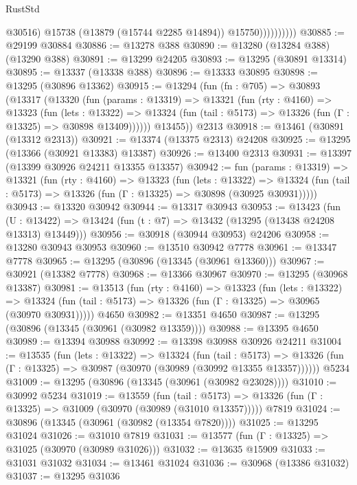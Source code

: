\begin{lexlean}{RustStd}
\begin{coremodule}
                          @30516)
                        @15738
                        (@13879 (@15744 @2285 @14894))
                        @15750))))))))))
@30885 := @29199 @30884
@30886 := @13278 @388
@30890 := @13280 (@13284 @388) (@13290 @388)
@30891 := @13299 @24205
@30893 := @13295 (@30891 @13314)
@30895 := @13337 (@13338 @388)
@30896 := @13333 @30895
@30898 := @13295 (@30896 @13362)
@30915 := @13294
    (fun (fn : @705) =>
    @30893
      (@13317
        (@13320
          (fun (params : @13319) =>
          @13321
            (fun (rty : @4160) =>
            @13323
              (fun (lets : @13322) =>
              @13324 (fun (tail : @5173) => @13326 (fun (Γ : @13325) => @30898 @13409))))))
        @13455))
    @2313
@30918 := @13461 (@30891 (@13312 @2313))
@30921 := @13374 (@13375 @2313) @24208
@30925 := @13295 (@13366 (@30921 @13383) @13387)
@30926 := @13400 @2313
@30931 := @13397 (@13399 @30926 @24211 @13355 @13357)
@30942 := fun (params : @13319) =>
  @13321
    (fun (rty : @4160) =>
    @13323
      (fun (lets : @13322) =>
      @13324 (fun (tail : @5173) => @13326 (fun (Γ : @13325) => @30898 (@30925 @30931)))))
@30943 := @13320 @30942
@30944 := @13317 @30943
@30953 := @13423
    (fun (U : @13422) => @13424 (fun (t : @7) => @13432 (@13295 (@13438 @24208 @13313) @13449)))
@30956 := @30918 (@30944 @30953) @24206
@30958 := @13280 @30943 @30953
@30960 := @13510 @30942 @7778
@30961 := @13347 @7778
@30965 := @13295 (@30896 (@13345 (@30961 @13360)))
@30967 := @30921 (@13382 @7778)
@30968 := @13366 @30967
@30970 := @13295 (@30968 @13387)
@30981 := @13513
    (fun (rty : @4160) =>
    @13323
      (fun (lets : @13322) =>
      @13324 (fun (tail : @5173) => @13326 (fun (Γ : @13325) => @30965 (@30970 @30931)))))
    @4650
@30982 := @13351 @4650
@30987 := @13295 (@30896 (@13345 (@30961 (@30982 @13359))))
@30988 := @13395 @4650
@30989 := @13394 @30988
@30992 := @13398 @30988 @30926 @24211
@31004 := @13535
    (fun (lets : @13322) =>
    @13324
      (fun (tail : @5173) =>
      @13326 (fun (Γ : @13325) => @30987 (@30970 (@30989 (@30992 @13355 @13357))))))
    @5234
@31009 := @13295 (@30896 (@13345 (@30961 (@30982 @23028))))
@31010 := @30992 @5234
@31019 := @13559
    (fun (tail : @5173) => @13326 (fun (Γ : @13325) => @31009 (@30970 (@30989 (@31010 @13357)))))
    @7819
@31024 := @30896 (@13345 (@30961 (@30982 (@13354 @7820))))
@31025 := @13295 @31024
@31026 := @31010 @7819
@31031 := @13577 (fun (Γ : @13325) => @31025 (@30970 (@30989 @31026)))
@31032 := @13635 @15909
@31033 := @31031 @31032
@31034 := @13461 @31024
@31036 := @30968 (@13386 @31032)
@31037 := @13295 @31036

\end{coremodule}
\end{lexlean}
